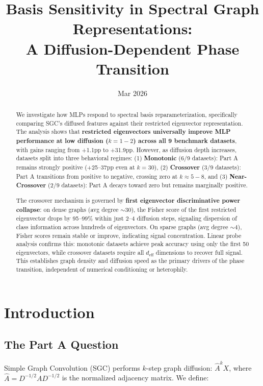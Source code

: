 \documentclass[11pt]{article}
\title{Basis Sensitivity in Spectral Graph Representations:\\
A Diffusion-Dependent Phase Transition}
\author{}
\date{Mar 2026}
\begin{document}
\maketitle

\begin{abstract}
We investigate how MLPs respond to spectral basis reparameterization, specifically comparing SGC's diffused features against their restricted eigenvector representation. The analysis shows that \textbf{restricted eigenvectors universally improve MLP performance at low diffusion ($k{=}1{-}2$) across all 9 benchmark datasets}, with gains ranging from +1.1pp to +31.9pp. However, as diffusion depth increases, datasets split into three behavioral regimes: (1) \textbf{Monotonic} (6/9 datasets): Part A remains strongly positive (+25--37pp even at $k{=}30$), (2) \textbf{Crossover} (3/9 datasets): Part A transitions from positive to negative, crossing zero at $k{\approx}5{-}8$, and (3) \textbf{Near-Crossover} (2/9 datasets): Part A decays toward zero but remains marginally positive.

The crossover mechanism is governed by \textbf{first eigenvector discriminative power collapse}: on dense graphs (avg degree ${\sim}30$), the Fisher score of the first restricted eigenvector drops by 95--99\% within just 2--4 diffusion steps, signaling dispersion of class information across hundreds of eigenvectors. On sparse graphs (avg degree ${\sim}4$), Fisher scores remain stable or improve, indicating signal concentration. Linear probe analysis confirms this: monotonic datasets achieve peak accuracy using only the first 50 eigenvectors, while crossover datasets require all $d_{\text{eff}}$ dimensions to recover full signal. This establishes graph density and diffusion speed as the primary drivers of the phase transition, independent of numerical conditioning or heterophily.
\end{abstract}

\section{Introduction}

\subsection{The Part A Question}

Simple Graph Convolution (SGC) performs $k$-step graph diffusion: $\hat{A}^k X$, where $\hat{A} = D^{-1/2}AD^{-1/2}$ is the normalized adjacency matrix. We define:
\end{document}
